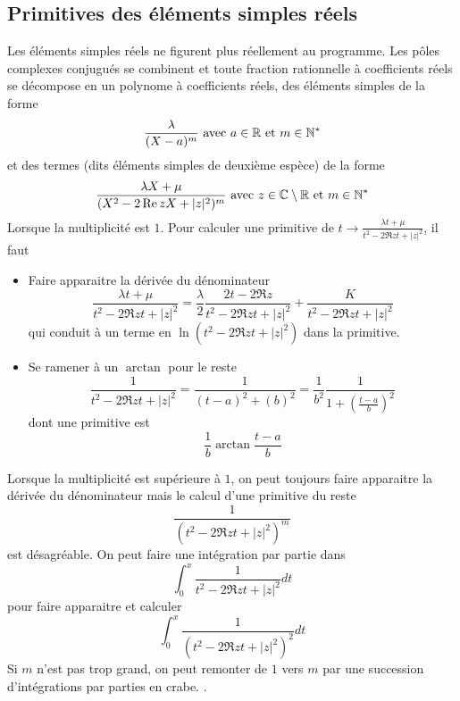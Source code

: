 \subsection{Primitives des éléments simples réels}
Les éléments simples réels ne figurent plus réellement au programme. Les pôles complexes conjugués se combinent et toute fraction rationnelle à coefficients réels se décompose en un polynome à coefficients réels, des éléments simples de la forme 
\begin{displaymath}
 \frac{\lambda}{(X-a)^m} \text{ avec } a\in \mathbb{R} \text{ et } m\in \mathbb{N}^*
\end{displaymath}
et des termes (dits éléments simples de deuxième espèce) de la forme
\begin{displaymath}
 \frac{\lambda X + \mu }{(X^2-2\mathop{\mathrm{Re}} z X +|z|^2)^m} \text{ avec } z\in\mathbb{C}\setminus \mathbb{R} \text{ et } m\in \mathbb{N}^*
\end{displaymath}
Lorsque la multiplicité est $1$. Pour calculer une primitive de $t\rightarrow \frac{\lambda t + \mu }{t^2-2\Re z t +|z|^2}$, il faut
\begin{itemize}
 \item Faire apparaitre la dérivée du dénominateur
\begin{displaymath}
 \frac{\lambda t + \mu }{t^2-2\Re z t +|z|^2} 
= \frac{\lambda}{2} \frac{2 t -2\Re z }{t^2-2\Re z t +|z|^2}
  + \frac{K }{t^2-2\Re z t +|z|^2} 
\end{displaymath}
qui conduit à un terme en $\ln(t^2-2\Re z t +|z|^2)$ dans la primitive.
\item Se ramener à un $\arctan$ pour le reste 
\begin{displaymath}
 \frac{1}{t^2-2\Re z t +|z|^2} = \frac{1 }{(t-a)^2 +(b)^2}
=\frac{1}{b^2} \frac{1 }{1+ \left( \frac{t-a}{b}\right) ^2}
\end{displaymath}
dont une primitive est
\begin{displaymath}
 \frac{1}{b}\arctan \frac{t-a}{b}
\end{displaymath}
\end{itemize}
Lorsque la multiplicité est supérieure à $1$, on peut toujours faire apparaitre la dérivée du dénominateur mais le calcul d'une primitive du reste
\begin{displaymath}
 \frac{1 }{(t^2-2\Re z t +|z|^2)^m}
\end{displaymath}
est désagréable. On peut faire une intégration par partie dans 
\begin{displaymath}
 \int_0^x \frac{1 }{t^2-2\Re z t +|z|^2}dt
\end{displaymath}
pour faire apparaitre et calculer
\begin{displaymath}
 \int_0^x \frac{1 }{(t^2-2\Re z t +|z|^2)^2}dt
\end{displaymath}
Si $m$ n'est pas trop grand, on peut remonter de $1$ vers $m$ par une succession d'intégrations par parties \og en crabe\fg. .

